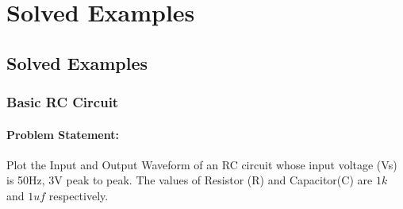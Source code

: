 \chapter{Solved Examples}
\thispagestyle{empty}
\label{chap11}

\section{Solved Examples}

\subsection{Basic RC Circuit}
\subsubsection{Problem Statement:} Plot the Input and Output Waveform of an RC circuit whose input voltage (Vs) is 50Hz, 3V peak to peak. The values of Resistor (R) and Capacitor(C) are $1k$ and $1uf$ respectively.
